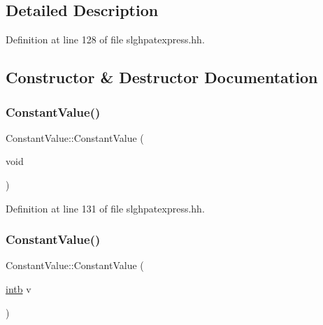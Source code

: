 \subsection{Detailed Description}


Definition at line 128 of file slghpatexpress.\+hh.



\subsection{Constructor \& Destructor Documentation}
\mbox{\label{class_constant_value_a7fe5694cd83a579505e166e2bb5e2ca5}} 
\subsubsection{\texorpdfstring{ConstantValue()}{ConstantValue()}\hspace{0.1cm}{\footnotesize\ttfamily [1/2]}}
{\footnotesize\ttfamily Constant\+Value\+::\+Constant\+Value (\begin{DoxyParamCaption}\item[{void}]{ }\end{DoxyParamCaption})\hspace{0.3cm}{\ttfamily [inline]}}



Definition at line 131 of file slghpatexpress.\+hh.

\mbox{\label{class_constant_value_a1b0fdc1faba5a705ece3195adc588971}} 
\subsubsection{\texorpdfstring{ConstantValue()}{ConstantValue()}\hspace{0.1cm}{\footnotesize\ttfamily [2/2]}}
{\footnotesize\ttfamily Constant\+Value\+::\+Constant\+Value (\begin{DoxyParamCaption}\item[{\mbox{\hyperlink{types_8h_aa925ba3e627c2df89d5b1cfe84fb8572}{intb}}}]{v }\end{DoxyParamCaption})\hspace{0.3cm}{\ttfamily [inline]}}



